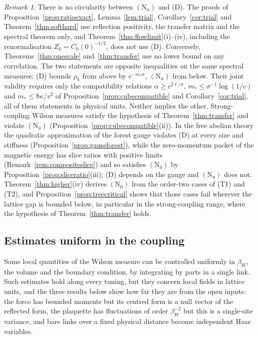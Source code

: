 \documentclass[11pt]{amsart}
\theoremstyle{definition}
\theoremstyle{remark}
\newtheorem{remark}[theorem]{Remark}
\numberwithin{equation}{section}
\begin{document}
\begin{remark}\label{rem:independence}
There is no circularity between $(\mathrm N_u)$ and (D). The proofs of
Proposition~\ref{prop:ratioexact}, Lemma~\ref{lem:trial},
Corollary~\ref{cor:trial} and Theorem~\ref{thm:softhard} use reflection
positivity, the transfer matrix and the spectral theorem only, and
Theorem~\ref{thm:flowlimit}(i)--(iv), including the renormalisation
$Z_k=C_k(0)^{-1/2}$, does not use (D). Conversely, Theorems~\ref{thm:onescale}
and~\ref{thm:transfer} use no lower bound on any correlation. The two
statements are opposite inequalities on the same spectral measures: (D)
bounds $\rho_k$ from above by $e^{-m_*\sigma}$, $(\mathrm N_u)$ from below.
Their joint validity requires only the compatibility relations
$\alpha\ge c^{2\ell/\sigma}$, $m_*\le\sigma^{-1}\log(1/c)$ and
$m_*\le8\kappa/v^2$ of Proposition~\ref{prop:cubecompatible} and
Corollary~\ref{cor:trial}, all of them statements in physical units. Neither
implies the other. Strong-coupling Wilson measures satisfy the hypothesis of
Theorem~\ref{thm:transfer} and violate $(\mathrm N_u)$
(Proposition~\ref{prop:cubecompatible}(ii)). In the free abelian theory the
quadratic approximation of the forest gauge violates (D) at every size and
stiffness (Proposition~\ref{prop:gaussforest}), while the zero-momentum packet
of the magnetic energy has slice ratios with positive limits
(Remark~\ref{rem:compositeslice}) and so satisfies $(\mathrm N_0)$ by
Proposition~\ref{prop:sliceratio}(iii); (D) depends on the gauge and
$(\mathrm N_u)$ does not. Theorem~\ref{thm:higher}(iv) derives $(\mathrm N_0)$
from the order-two cases of (T1) and (T2), and
Proposition~\ref{prop:treecritical} shows that those cases fail wherever the
lattice gap is bounded below, in particular in the strong-coupling range,
where the hypothesis of Theorem~\ref{thm:transfer} holds.
\end{remark}

\subsection{Estimates uniform in the coupling}\label{ssec:uniform}

Some local quantities of the Wilson measure can be controlled uniformly in
$\beta_W$, the volume and the boundary condition, by integrating by parts in a
single link. Such estimates hold along every tuning, but they concern local
fields in lattice units, and the three results below show how far they are
from the open inputs: the force has bounded moments but its centred form is a
null vector of the reflected form, the plaquette has fluctuations of order
$\beta_W^{-2}$ but this is a single-site variance, and bare links over a fixed
physical distance become independent Haar variables.
\end{document}
